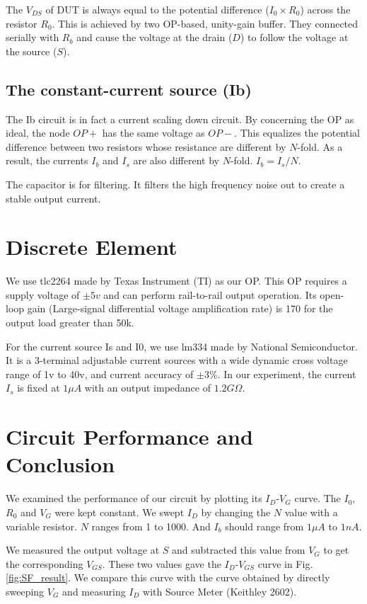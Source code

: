 The $V_{DS}$ of DUT is always equal to the potential difference ($I_0 \times R_0$) across the resistor $R_0$.
This is achieved by two OP-based, unity-gain buffer.
They connected serially with $R_b$ and cause the voltage at the drain ($D$) to follow the voltage at the source ($S$).


\subsection*{The  constant-current source (Ib)}
The Ib circuit is in fact a current scaling down circuit.
By concerning the OP as ideal, the node $OP+$ has the same voltage as $OP-$.
This equalizes the potential difference between two resistors whose resistance are different by $N$-fold.
As a result, the currents $I_b$ and $I_s$ are also different by $N$-fold.
$I_b = I_s / N$.

The capacitor is for filtering. It filters the high frequency noise out to create a stable output current.


\section{Discrete Element}
We use tlc2264 made by Texas Instrument (TI) as our OP.
This OP requires a supply voltage of $\pm 5v$ and can perform rail-to-rail output operation.
Its open-loop gain (Large-signal differential voltage amplification rate) is 170 for the output load greater than 50k.

For the current source Is and I0, we use lm334 made by National Semiconductor.
It is a 3-terminal adjustable current sources with a wide dynamic cross voltage range of 1v to 40v, and current accuracy of $\pm 3\%$.
In our experiment, the current $I_s$ is fixed at $1\mu A$ with an output impedance of $1.2G\Omega$.

\section{Circuit Performance and Conclusion}
We examined the performance of our circuit by plotting its $I_D$-$V_G$ curve.
The $I_0$, $R_0$ and $V_G$ were kept constant.
We swept $I_D$ by changing the $N$ value with a variable resistor.
$N$ ranges from 1 to 1000.
And $I_b$ should range from $1\mu A$ to $1n A$.

We measured the output voltage at $S$ and subtracted this value from $V_G$ to get the corresponding $V_{GS}$.
These two values gave the $I_D$-$V_{GS}$ curve in Fig.\ref{fig:SF_result}.
We compare this curve with the curve obtained by directly sweeping $V_G$ and measuring $I_D$ with Source Meter (Keithley 2602).

